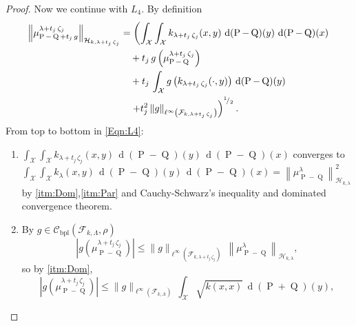 \begin{proof}
				Now we continue with $L_{4}$. By definition
				\begin{equation}\label{Eqn:L4}
					\begin{aligned}
						\left\|\mu_{\operatorname{P}-\operatorname{Q}+t_{j}\,g}^{\lambda+t_{j}\,\zeta_{j}}\right\|_{\mathcal{H}_{k,\lambda+t_{j}\,\zeta_{j}}}&=\left(\int_{\mathcal{X}}\int_{\mathcal{X}}k_{\lambda+t_{j}\,\zeta_{j}}(x,y)\,\operatorname{d}(\operatorname{P}-\operatorname{Q})(y)\,\operatorname{d}(\operatorname{P}-\operatorname{Q})(x)\right.
						\\
						&\quad+t_{j}\,g\left(\mu_{\operatorname{P}-\operatorname{Q}}^{\lambda+t_{j}\,\zeta_{j}}\right)
						\\
						&\quad+t_{j}\,\int_{\mathcal{X}}g\left(k_{\lambda+t_{j}\,\zeta_{j}}(\cdot,y)\right)\,\operatorname{d}(\operatorname{P}-\operatorname{Q})(y)
						\\
						&\quad\left.+t_{j}^{2}\,\|g\|_{\ell^{\infty}\left(\mathcal{F}_{k,\lambda+t_{j}\,\zeta_{j}}\right)}\right)^{^{1}\!/_{2}}.
					\end{aligned}
				\end{equation}
				From top to bottom in \eqref{Eqn:L4}:
				\begin{enumerate}
					\item $\displaystyle\int_{\mathcal{X}}\int_{\mathcal{X}}k_{\lambda+t_{j}\,\zeta_{j}}(x,y)\,\operatorname{d}(\operatorname{P}-\operatorname{Q})(y)\,\operatorname{d}(\operatorname{P}-\operatorname{Q})(x)$ converges to\break$\displaystyle\int_{\mathcal{X}}\int_{\mathcal{X}}k_{\lambda}(x,y)\,\operatorname{d}(\operatorname{P}-\operatorname{Q})(y)\,\operatorname{d}(\operatorname{P}-\operatorname{Q})(x)=\left\|\mu_{\operatorname{P}-\operatorname{Q}}^{\lambda}\right\|_{\mathcal{H}_{k,\lambda}}^{2}$ by \ref{itm:Dom},\ref{itm:Par} and Cauchy-Schwarz's inequality and dominated convergence theorem.
					\item By $g\in\mathcal{C}_{\operatorname{bpl}}\left(\mathcal{F}_{k,\Lambda},\rho\right)$
					\begin{equation}
						\left|g\left(\mu_{\operatorname{P}-\operatorname{Q}}^{\lambda+t_{j}\,\zeta_{j}}\right)\right|\leq\|g\|_{\ell^{\infty}\left(\mathcal{F}_{k,\lambda+t_{j}\,\zeta_{j}}\right)}\,\left\|\mu_{\operatorname{P}-\operatorname{Q}}^{\lambda}\right\|_{\mathcal{H}_{k,\lambda}},
					\end{equation}
					so by \ref{itm:Dom},
					\begin{equation}
						\left|g\left(\mu_{\operatorname{P}-\operatorname{Q}}^{\lambda+t_{j}\,\zeta_{j}}\right)\right|\leq\|g\|_{\ell^{\infty}\left(\mathcal{F}_{k,\Lambda}\right)}\,\int_{\mathcal{X}}\sqrt{k(x,x)}\,\operatorname{d}(\operatorname{P}+\operatorname{Q})(y),

\end{equation}
\end{enumerate}
\end{proof}

